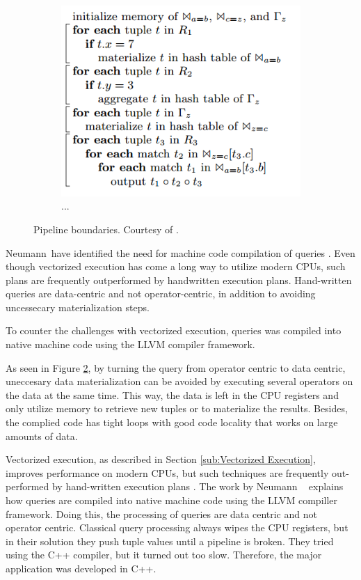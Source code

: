 \begin{figure}
\begin{subfigure}{0.45\textwidth}
    \includegraphics[width=\textwidth]{img/pipeline-boundary-2.png}
    \caption{...}
    \label{fig:pipeline-boundary-2} 
  \end{subfigure}
  \caption{Pipeline boundaries. Courtesy of \cite{Neumann2011-uq}.}
  \label{fig:pipeline-boundary} 
\end{figure}

Neumann~\ea have identified the need for machine code compilation of queries \cite{Neumann2011-uq}. Even though vectorized execution has come a long way to utilize modern CPUs, such plans are frequently outperformed by handwritten execution plans. Hand-written queries are data-centric and not operator-centric, in addition to avoiding uncessecary materialization steps.

To counter the challenges with vectorized execution, queries was compiled into native machine code using the LLVM compiler framework.

As seen in Figure \ref{fig:pipeline-boundary}, by turning the query from operator centric to data centric, uneccesary data materialization can be avoided by executing several operators on the data at the same time. This way, the data is left in the CPU registers and only utilize memory to retrieve new tuples or to materialize the results. Besides, the complied code has tight loops with good code locality that works on large amounts of data.


Vectorized execution, as described in Section \ref{sub:Vectorized Execution}, improves performance on modern CPUs, but such techniques are frequently out-performed by hand-written execution plans \cite{Neumann2011-uq}. The work by Neumann \ea~\cite{Neumann2011-uq} explains how queries are compiled into native machine code using the LLVM compiller framework. Doing this, the processing of queries are data centric and not operator centric. Classical query processing always wipes the CPU registers, but in their solution they push tuple values until a pipeline is broken. They tried using the C++ compiler, but it turned out too slow. Therefore, the major application was developed in C++.

